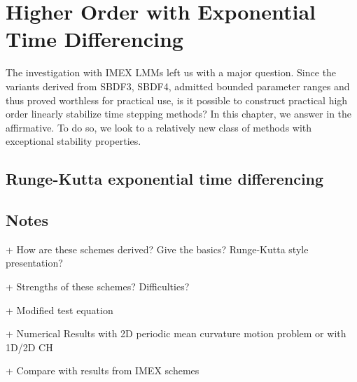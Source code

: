\chapter{Higher Order with Exponential Time Differencing}
The investigation with IMEX LMMs left us with a major question. Since the variants derived from SBDF3, SBDF4, admitted bounded parameter ranges and thus proved worthless for practical use, is it possible to construct practical high order linearly stabilize time stepping methods? In this chapter, we answer in the affirmative. To do so, we look to a relatively new class of methods with exceptional stability properties. 

\section{Runge-Kutta exponential time differencing }

\section{Notes}
+ How are these schemes derived? Give the basics? Runge-Kutta style presentation? 

+ Strengths of these schemes? Difficulties? 

+ Modified test equation

+ Numerical Results with 2D periodic mean curvature motion problem or with 1D/2D CH 

+ Compare with results from IMEX schemes
